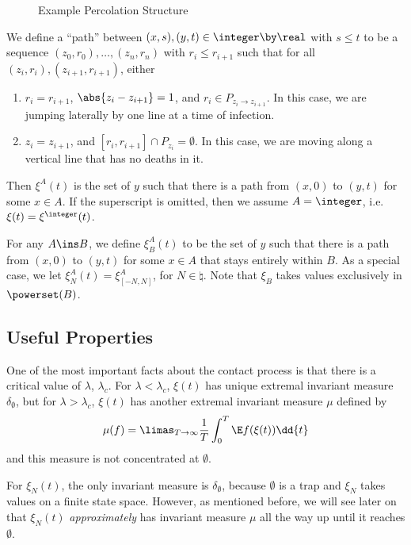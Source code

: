 \documentclass{scrartcl}
\begin{document}
\begin{figure}[h!]
  \centering
  \caption{Example Percolation Structure}
  \label{fig:ex_perc_structure}
\end{figure}

We define a ``path'' between $(x,s), (y,t) \in \integer \by \real$ with $s \leq t$ to be a sequence
$(z_{0},r_{0}), \ldots, (z_{n},r_{n})$ with $r_{i} \leq r_{i+1}$ such that for all $(z_{i},r_{i}),(z_{i+1},r_{i+1})$, either
\begin{enumerate}
  \item $r_{i} = r_{i+1}$, $\abs{z_{i} - z_{i+1}} = 1$, and $r_{i} \in P_{z_{i} \to z_{i+1}}$. In this case, we are jumping laterally by one line at a time of infection.
  \item $z_{i} = z_{i+1}$, and $[r_{i},r_{i+1}] \cap P_{z_{i}} = \emptyset$. In this case, we are moving along a vertical line that has no deaths in it.
\end{enumerate}

Then $\xi^{A}(t)$ is the set of $y$ such that there is a path from $(x,0)$ to $(y,t)$ for some $x \in A$. If the superscript is omitted, then we assume $A = \integer$, i.e. $\xi(t) = \xi^{\integer}(t)$.

For any $A \ins B$, we define $\xi_{B}^{A}(t)$ to be the set of $y$ such that there is a path from $(x,0)$ to $(y,t)$ for some $x \in A$ that stays entirely within $B$. As a special case, we let $\xi_{N}^{A}(t) = \xi_{[-N,N]}^{A}$, for $N \in \natural$. Note that $\xi_{B}$ takes values exclusively in $\powerset(B)$.

\subsection{Useful Properties}

One of the most important facts about the contact process is that there is a critical value of $\lambda$, $\lambda_{c}$. For $\lambda < \lambda_{c}$, $\xi(t)$ has unique extremal invariant measure $\delta_{\emptyset}$, but for $\lambda > \lambda_{c}$, $\xi(t)$ has another extremal invariant measure $\mu$ defined by
\[ \mu(f) = \limas_{T \to \infty} \frac{1}{T} \int_{0}^{T} \E f(\xi(t)) \dd{t} \]
and this measure is not concentrated at $\emptyset$.

For $\xi_{N}(t)$, the only invariant measure is $\delta_{\emptyset}$, because $\emptyset$ is a trap and $\xi_{N}$ takes values on a finite state space. However, as mentioned before, we will see later on that $\xi_{N}(t)$ \emph{approximately} has invariant measure $\mu$ all the way up until it reaches $\emptyset$.
\end{document}
